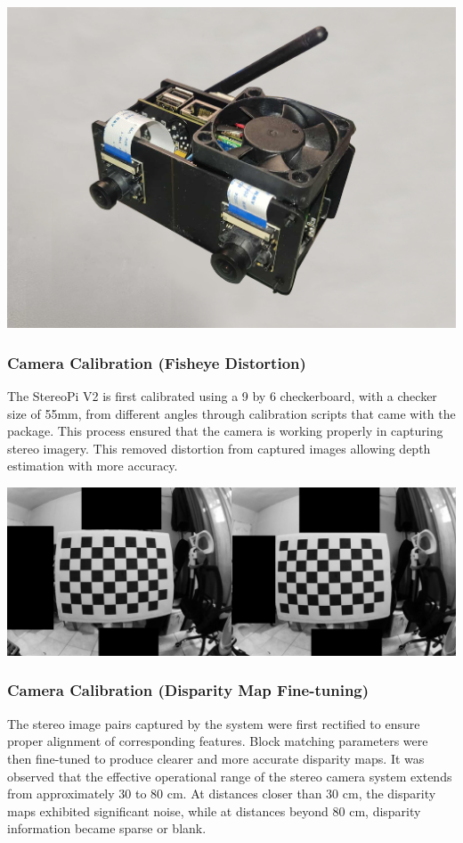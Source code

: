 \begin{center}
	\includegraphics[scale=0.20]{prototype.png}
\end{center}


\subsubsection{Camera Calibration (Fisheye Distortion)}
The StereoPi V2 is first calibrated using a 9 by 6 checkerboard, with a checker size of 55mm, from different angles through calibration scripts that came with the package. This process ensured that the camera is working properly in capturing stereo imagery. This removed distortion from captured images allowing depth estimation with more accuracy. 

\begin{center}
	\includegraphics[scale=0.25]{calibration.png}
\end{center}

\subsubsection{Camera Calibration (Disparity  Map Fine-tuning)}
The stereo image pairs captured by the system were first rectified to ensure proper alignment of corresponding features. Block matching parameters were then fine-tuned to produce clearer and more accurate disparity maps. It was observed that the effective operational range of the stereo camera system extends from approximately 30 to 80 cm. At distances closer than 30 cm, the disparity maps exhibited significant noise, while at distances beyond 80 cm, disparity information became sparse or blank.

